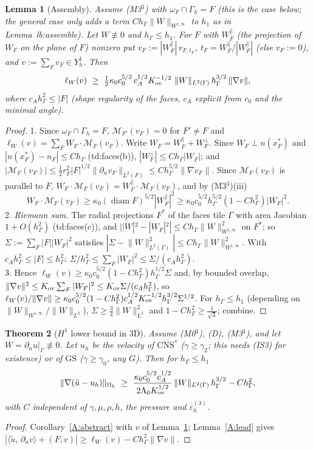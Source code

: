 \documentclass[11pt]{article}
\newtheorem{theorem}{Theorem}[section]
\newtheorem{lemma}[theorem]{Lemma}
\theoremstyle{definition}
\newcommand{\hG}{h_\Gamma}
\newcommand{\Gh}{\Gamma_h}
\newcommand{\Oh}{\Omega_h}
\newcommand{\dn}{\partial_n}
\newcommand{\ut}{\tilde u}
\newcommand{\ip}[2]{\langle #1,\, #2\rangle}
\newcommand{\norm}[1]{\lVert #1\rVert}
\newcommand{\GS}{\mathrm{GS}}
\newcommand{\CNS}{\mathrm{CNS}^\ast}
\newcommand{\M}{\mathcal M}
\DeclareMathOperator{\diam}{diam}
\begin{document}
\begin{lemma}[Assembly]\label{A:assemble}
Assume (M3$^3$) with $\omega_F\cap\Gh=F$ (this is the case below; the general case only adds a term $C\hG\norm W_{W^{1,\infty}}$ to $h_1$ as in Lemma~lb:assemble). Let $W\not\equiv0$ and $\hG\le h_1$. For $F$ with $W_F^\parallel$ (the projection of $W_F$ on the plane of $F$) nonzero put $v_F:=|W_F^\parallel|\,v_{F,t_F}$, $t_F=W_F^\parallel/|W_F^\parallel|$ (else $v_F:=0$), and $v:=\sum_Fv_F\in Y_h^1$. Then
\[
\ell_W(v)\ \ge\ \tfrac12\kappa_0c_0^{5/2}\,c_A^{1/2}K_{\rm ov}^{-1/2}\ \norm W_{L^2(\Gamma)}\,\hG^{3/2}\,\norm{\nabla v},
\]
where $c_A\hG^2\le|F|$ (shape regularity of the faces, $c_A$ explicit from $c_0$ and the minimal angle).
\end{lemma}
\begin{proof}
1. Since $\omega_F\cap\Gh=F$, $\M_{F'}(v_F)=0$ for $F'\ne F$ and $\ell_W(v)=\sum_FW_F\cdot\M_F(v_F)$. Write $W_F=W_F^\parallel+W_F^\perp$. Since $W_F\perp n(x_F^\ast)$ and $|n(x^\ast_F)-n_F|\le C\hG$ (td:faces(b)), $|W_F^\perp|\le C\hG|W_F|$; and $|\M_F(v_F)|\le\frac12r_F^2|F|^{1/2}\norm{\dn v_F}_{L^2(F)}\le C\hG^{5/2}\norm{\nabla v_F}$. Since $\M_F(v_F)$ is parallel to $F$, $W_F\cdot\M_F(v_F)=W_F^\parallel\cdot\M_F(v_F)$, and by (M3$^3$)(iii)
\[
W_F\cdot\M_F(v_F)\ge\kappa_0(\diam F)^{5/2}|W_F^\parallel|^2\ge\kappa_0c_0^{5/2}\hG^{5/2}(1-C\hG^2)|W_F|^2 .
\]
2. \emph{Riemann sum.} The radial projections $F^\ast$ of the faces tile $\Gamma$ with area Jacobian $1+O(\hG^2)$ (td:faces(c)), and $||W|^2-|W_F|^2|\le C\hG\norm W_{W^{1,\infty}}^2$ on $F^\ast$; so $\Sigma:=\sum_F|F||W_F|^2$ satisfies $|\Sigma-\norm W^2_{L^2(\Gamma)}|\le C\hG\norm W^2_{W^{1,\infty}}$. With $c_A\hG^2\le|F|\le\hG^2$: $\Sigma/\hG^2\le\sum_F|W_F|^2\le\Sigma/(c_A\hG^2)$.\\
3. Hence $\ell_W(v)\ge\kappa_0c_0^{5/2}(1-C\hG^2)\hG^{1/2}\Sigma$ and, by bounded overlap, $\norm{\nabla v}^2\le K_{\rm ov}\sum_F|W_F|^2\le K_{\rm ov}\Sigma/(c_A\hG^2)$, so $\ell_W(v)/\norm{\nabla v}\ge\kappa_0c_0^{5/2}(1-C\hG^2)c_A^{1/2}K_{\rm ov}^{-1/2}\hG^{3/2}\Sigma^{1/2}$. For $\hG\le h_1$ (depending on $\norm W_{W^{1,\infty}}/\norm W_{L^2}$), $\Sigma\ge\frac34\norm W^2_{L^2}$ and $1-C\hG^2\ge\frac{1}{\sqrt3}$; combine.
\end{proof}

\begin{theorem}[$H^1$ lower bound in 3D]\label{A:thm}
Assume (M0$^3$), (D), (M3$^3$), and let $W=\dn u|_\Gamma\not\equiv0$. Let $u_h$ be the velocity of $\CNS$ ($\gamma\ge\gamma_2$; this needs (IS3) for existence) or of $\GS$ ($\gamma\ge\gamma_0$, any $G$). Then for $\hG\le h_1$
\[
\norm{\nabla(\ut-u_h)}_{\Oh}\ \ge\ \frac{\kappa_0c_0^{5/2}c_A^{1/2}}{2\Lambda_0K_{\rm ov}^{1/2}}\,\norm W_{L^2(\Gamma)}\,\hG^{3/2}-C\hG^2 ,
\]
with $C$ independent of $\gamma,\mu,\rho,h$, the pressure and $\varepsilon_h^{(3)}$.
\end{theorem}
\begin{proof}
Corollary~\ref{A:abstract} with $v$ of Lemma~\ref{A:assemble}; Lemma~\ref{A:lead} gives $|\ip{\ut}{\dn v}+(F,v)|\ge\ell_W(v)-C\hG^2\norm{\nabla v}$.
\end{proof}
\end{document}
